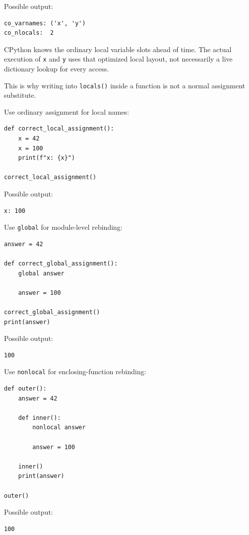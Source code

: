 Possible output:

\begin{verbatim}
co_varnames: ('x', 'y')
co_nlocals:  2
\end{verbatim}

CPython knows the ordinary local variable slots ahead of time. The actual execution of \texttt{x} and \texttt{y} uses that optimized local layout, not necessarily a live dictionary lookup for every access.

This is why writing into \texttt{locals()} inside a function is not a normal assignment substitute.

Use ordinary assignment for local names:

\begin{verbatim}
def correct_local_assignment():
    x = 42
    x = 100
    print(f"x: {x}")

correct_local_assignment()
\end{verbatim}

Possible output:

\begin{verbatim}
x: 100
\end{verbatim}

Use \texttt{global} for module-level rebinding:

\begin{verbatim}
answer = 42

def correct_global_assignment():
    global answer

    answer = 100

correct_global_assignment()
print(answer)
\end{verbatim}

Possible output:

\begin{verbatim}
100
\end{verbatim}

Use \texttt{nonlocal} for enclosing-function rebinding:

\begin{verbatim}
def outer():
    answer = 42

    def inner():
        nonlocal answer

        answer = 100

    inner()
    print(answer)

outer()
\end{verbatim}

Possible output:

\begin{verbatim}
100
\end{verbatim}

